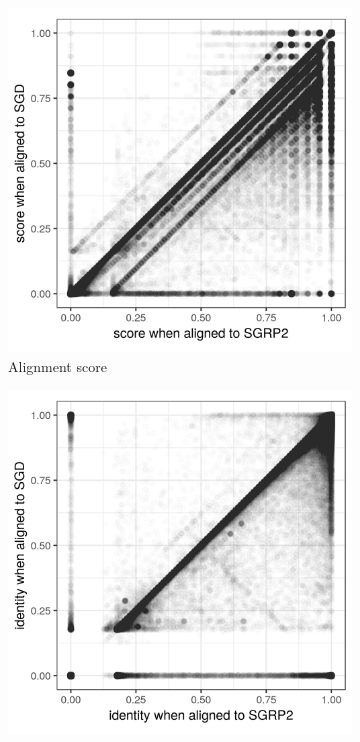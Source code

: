 \begin{figure}[htbp!] 
  \centering
  \begin{subfigure}[t]{0.49\textwidth}
    \includegraphics[width=1.0\textwidth]{Chapter3/Figs/NCYC_SGRP2_SGD_comparison_score.png}
    \caption{Alignment score} \label{subfig:NCYC_score}
  \end{subfigure}
  \begin{subfigure}[t]{0.49\textwidth}
    \includegraphics[width=1.0\textwidth]{Chapter3/Figs/NCYC_SGRP2_SGD_comparison_id.png}

\end{subfigure}
\end{figure}
